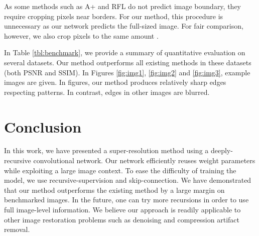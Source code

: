 \documentclass[10pt,twocolumn,letterpaper]{article}
\begin{document}
As  some methods such as A+ \cite{Timofte} and  RFL \cite{schulter2015fast} do not predict image boundary, they require cropping pixels near borders. For our method, this procedure is unnecessary as our network predicts the full-sized image. For fair comparison, however, we also crop pixels to the same amount \footnotemark{}.


In Table \ref{tbl:benchmark}, we provide a summary of quantitative evaluation on several datasets. 
Our method outperforms all existing methods in these datasets (both PSNR and SSIM). In Figures \ref{fig:img1}, \ref{fig:img2} and \ref{fig:img3}, example images are given. In figures, our method produces relatively sharp edges respecting patterns. In contrast, edges in other images are blurred.

\section{Conclusion}
In this work, we have presented a super-resolution method using a deeply-recursive convolutional network. Our network efficiently reuses weight parameters while exploiting a large image context. To ease the difficulty of training the model, we use recursive-supervision and skip-connection. We have demonstrated that our method outperforms the existing method by a large margin on benchmarked images. In the future, one can try more recursions in order to use full image-level information. We believe our approach is readily applicable to other image restoration problems such as denoising and compression artifact removal.

{\small
	
	
}
\end{document}
